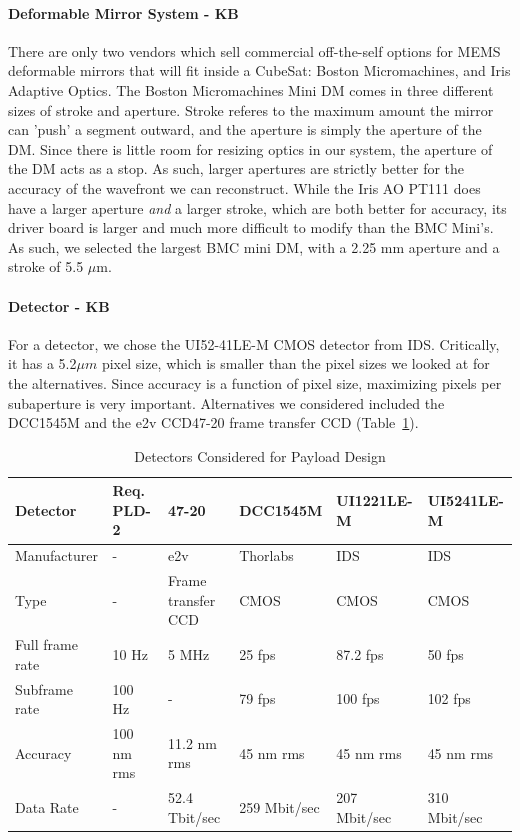 \documentclass[12pt]{article}
\begin{document}
\paragraph{Deformable Mirror System - KB} \label{par:payload_dms}

There are only two vendors which sell commercial off-the-self options for MEMS deformable mirrors that will fit inside a CubeSat: Boston Micromachines, and Iris Adaptive Optics. The Boston Micromachines Mini DM comes in three different sizes of stroke and aperture. Stroke
referes to the maximum amount the mirror can 'push' a segment outward, and the aperture is simply the aperture of the DM. Since there is little room for resizing optics in our system, the aperture of the DM
acts as a stop. As such, larger apertures are strictly better for the accuracy of the wavefront we can reconstruct. While the Iris AO PT111 does have a larger aperture \emph{and} a larger stroke, which are both
better for accuracy, its driver board is larger and much more difficult to modify than the BMC Mini's. As such, we selected the largest BMC mini DM, with a 2.25 mm aperture and a stroke of 5.5 $\mu \text{m}$.

\paragraph{Detector - KB} \label{par:payload_detector}

For a detector, we chose the UI52-41LE-M CMOS detector from
IDS. Critically, it has a 5.2$\mu m$ pixel size, which is smaller than
the pixel sizes we looked at for the alternatives. Since accuracy is a
function of pixel size, maximizing pixels per subaperture is very
important. Alternatives we considered included the DCC1545M and the
e2v CCD47-20 frame transfer CCD (Table~\ref{table:payload_detectors}). 
\begin{table}[!ht]
  \caption{Detectors Considered for Payload Design}
    \begin{tabular}{|l||l|llll|}
    \hline
    Detector                      & Req. PLD-2
    &47-20&DCC1545M&UI1221LE-M&UI5241LE-M\\ \hline \hline
    Manufacturer&-&e2v&Thorlabs&IDS&IDS\\ \hline
    Type&-&Frame transfer CCD&CMOS&CMOS&CMOS\\ \hline
    Full frame rate&  10 Hz            & 5 MHz                       & 25 fps                 & 87.2 fps            & 50 fps              \\ \hline
    Subframe rate& 100 Hz            & -                           & 79 fps                 & 100 fps             & 102 fps             \\ \hline
    Accuracy       & 100 nm rms        & 11.2 nm rms                 & 45 nm rms              & 45 nm rms           & 45 nm rms           \\ \hline
    Data Rate& -                 & 52.4 Tbit/sec               & 259 Mbit/sec           & 207 Mbit/sec        & 310 Mbit/sec        \\\hline
    \end{tabular}\label{table:payload_detectors}
\end{table}
\end{document}
